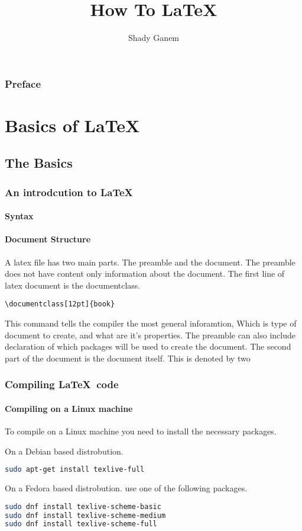\documentclass[12pt]{book}
\title{How To \LaTeX}
\author{Shady Ganem}
\begin{document}
\maketitle
\section*{Preface}
\tableofcontents
\newpage
\part{Basics of \LaTeX}
\chapter{The Basics}
\section{An introdcution to \LaTeX \ }
\subsection{Syntax}
\subsection{Document Structure}
A latex file has two main parts. The preamble and the document.
The preamble does not have content only information about the document. 
The first line of latex document is the documentclass. 
\begin{verbatim}
\documentclass[12pt]{book}
\end{verbatim}
This command tells the compiler the most general inforamtion, Which is type of
document to create, and what are it's properties.
The preamble can also include declaration of which packages will be used to create the document.
\newline
The second part of the document is the document itself. This is denoted by two 
\section{Compiling \LaTeX \ code}
\subsection{Compiling on a Linux machine}
To compile on a Linux machine you need to install the necessary packages.

On a Debian based distrobution.
\begin{lstlisting}[language=bash]
sudo apt-get install texlive-full 
\end{lstlisting}
On a Fedora based distrobution. use one of the following packages.
\begin{lstlisting}[language=bash]
sudo dnf install texlive-scheme-basic
sudo dnf install texlive-scheme-medium
sudo dnf install texlive-scheme-full
\end{lstlisting}
\newpage
\end{document}
